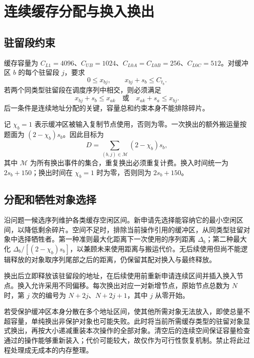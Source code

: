 \section{连续缓存分配与换入换出}
\subsection{驻留段约束}
缓存容量为 $C_{L1}=4096$、$C_{UB}=1024$、$C_{L0A}=C_{L0B}=256$、$C_{L0C}=512$。对缓冲区 $b$ 的每个驻留段 $j$，要求
\begin{equation}0\le x_{bj},\qquad x_{bj}+s_b\le C_{t_b}.\end{equation}
若两个同类型驻留段在调度序列中相交，则必须满足
\begin{equation}
x_{bj}+s_b\le x_{ak}\quad\text{或}\quad x_{ak}+s_a\le x_{bj}.
\end{equation}
后一条件是连续地址分配的关键，容量总和约束本身不能排除碎片。

记 $\chi_b=1$ 表示缓冲区被输入复制节点使用，否则为零。一次换出的额外搬运量按题面为 $(2-\chi_b)s_b$。因此目标为
\begin{equation}D=\sum_{(b,j)\in\mathcal{M}}(2-\chi_b)s_b,\end{equation}
其中 $\mathcal{M}$ 为所有换出事件的集合，重复换出必须重复计费。换入时间统一为 $2s_b+150$；换出时间在 $\chi_b=1$ 时为零，否则同为 $2s_b+150$。

\subsection{分配和牺牲对象选择}
沿问题一候选序列维护各类缓存空闲区间。新申请先选择能容纳它的最小空闲区间，以降低剩余碎片。空间不足时，排除当前操作引用的缓冲区，从同类型驻留对象中选择牺牲者。第一种准则最大化距离下一次使用的序列距离 $\Delta_b$；第二种最大化 $\Delta_b/[(2-\chi_b)s_b]$，以兼顾未来使用距离与搬运代价。无后续使用但尚不能逻辑释放的对象取序列尾部之后的距离，仍保留其配对换入与最终释放。

换出后立即释放该驻留段的地址，在后续使用前重新申请连续区间并插入换入节点。换入允许采用不同偏移。每次换出对应一对新增节点，原始节点总数为 $N$ 时，第 $j$ 次的编号为 $N+2j$、$N+2j+1$，其中 $j$ 从零开始。

若受保护缓冲区本身分散在多个地址区间，使其他所需对象无法放入，即使总量不超容量，单纯换出非保护对象也可能失败。此时将当前所需缓存类型的驻留对象显式换出，再按大小递减重装本次操作的全部对象。清空后的连续空间保证容量检查通过的操作能够重新装入；代价可能较大，故仅作为可行性恢复机制。禁止将此过程处理成无成本的内存整理。

